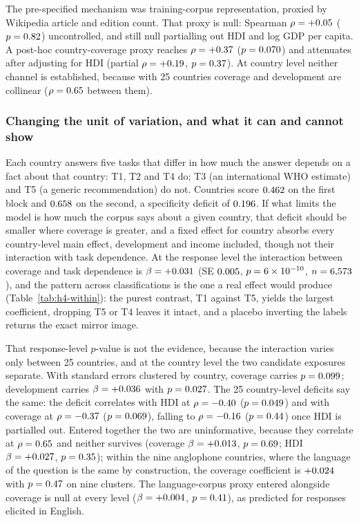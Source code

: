 The pre-specified mechanism was training-corpus representation, proxied by
Wikipedia article and edition count. That proxy is null: Spearman
$\rho=+0.05$ ($p=0.82$) uncontrolled, and still null partialling
out HDI and log GDP per capita. A post-hoc country-coverage proxy reaches
$\rho=+0.37$ ($p=0.070$) and attenuates after adjusting for HDI
(partial $\rho=+0.19$, $p=0.37$). At country level neither
channel is established, because with 25 countries coverage and development are
collinear ($\rho=0.65$ between them).

\subsubsection*{Changing the unit of variation, and what it can and cannot show}

Each country answers five tasks that differ in how much the answer depends on
a fact about that country: T1, T2 and T4 do; T3 (an international WHO estimate)
and T5 (a generic recommendation) do not. Countries score $0.462$ on the
first block and $0.658$ on the second, a specificity deficit of
$0.196$. If what limits the model is how much the corpus says about a
given country, that deficit should be smaller where coverage is greater, and a
fixed effect for country absorbs every country-level main effect, development
and income included, though not their interaction with task dependence. At the
response level the interaction between coverage and task dependence is
$\beta=+0.031$ (SE $0.005$, $p=6\times10^{-10}$, $n=6{,}573$), and the
pattern across classifications is the one a real effect would produce
(Table~\ref{tab:h4-within}): the purest contrast, T1 against T5, yields the
largest coefficient, dropping T5 or T4 leaves it intact, and a placebo
inverting the labels returns the exact mirror image.

That response-level $p$-value is not the evidence, because the interaction
varies only between 25 countries, and at the country level the two candidate
exposures separate. With standard errors clustered by country, coverage carries
$p=0.099$; development carries $\beta=+0.036$ with
$p=0.027$. The 25 country-level deficits say the same: the
deficit correlates with HDI at $\rho=-0.40$
($p=0.049$) and with coverage at $\rho=-0.37$
($p=0.069$), falling to $\rho=-0.16$
($p=0.44$) once HDI is partialled out. Entered together the two
are uninformative, because they correlate at $\rho=0.65$ and neither
survives (coverage $\beta=+0.013$, $p=0.69$; HDI
$\beta=+0.027$, $p=0.35$); within the nine anglophone countries,
where the language of the question is the same by construction, the coverage
coefficient is $+0.024$ with $p=0.47$ on nine clusters. The
language-corpus proxy entered alongside coverage is null at every level
($\beta=+0.004$, $p=0.41$), as predicted for responses elicited in
English.

